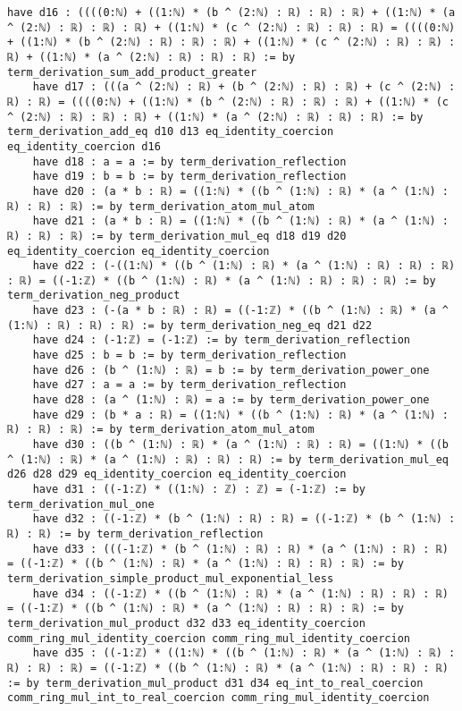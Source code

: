 \documentclass{article}
\begin{document}
\begin{tcolorbox}[colback=white!10, width=\linewidth]
\begin{lstlisting}[language=Lean4]
    have d16 : ((((0:ℕ) + ((1:ℕ) * (b ^ (2:ℕ) : ℝ) : ℝ) : ℝ) + ((1:ℕ) * (a ^ (2:ℕ) : ℝ) : ℝ) : ℝ) + ((1:ℕ) * (c ^ (2:ℕ) : ℝ) : ℝ) : ℝ) = ((((0:ℕ) + ((1:ℕ) * (b ^ (2:ℕ) : ℝ) : ℝ) : ℝ) + ((1:ℕ) * (c ^ (2:ℕ) : ℝ) : ℝ) : ℝ) + ((1:ℕ) * (a ^ (2:ℕ) : ℝ) : ℝ) : ℝ) := by term_derivation_sum_add_product_greater
    have d17 : (((a ^ (2:ℕ) : ℝ) + (b ^ (2:ℕ) : ℝ) : ℝ) + (c ^ (2:ℕ) : ℝ) : ℝ) = ((((0:ℕ) + ((1:ℕ) * (b ^ (2:ℕ) : ℝ) : ℝ) : ℝ) + ((1:ℕ) * (c ^ (2:ℕ) : ℝ) : ℝ) : ℝ) + ((1:ℕ) * (a ^ (2:ℕ) : ℝ) : ℝ) : ℝ) := by term_derivation_add_eq d10 d13 eq_identity_coercion eq_identity_coercion d16
    have d18 : a = a := by term_derivation_reflection
    have d19 : b = b := by term_derivation_reflection
    have d20 : (a * b : ℝ) = ((1:ℕ) * ((b ^ (1:ℕ) : ℝ) * (a ^ (1:ℕ) : ℝ) : ℝ) : ℝ) := by term_derivation_atom_mul_atom
    have d21 : (a * b : ℝ) = ((1:ℕ) * ((b ^ (1:ℕ) : ℝ) * (a ^ (1:ℕ) : ℝ) : ℝ) : ℝ) := by term_derivation_mul_eq d18 d19 d20 eq_identity_coercion eq_identity_coercion
    have d22 : (-((1:ℕ) * ((b ^ (1:ℕ) : ℝ) * (a ^ (1:ℕ) : ℝ) : ℝ) : ℝ) : ℝ) = ((-1:ℤ) * ((b ^ (1:ℕ) : ℝ) * (a ^ (1:ℕ) : ℝ) : ℝ) : ℝ) := by term_derivation_neg_product
    have d23 : (-(a * b : ℝ) : ℝ) = ((-1:ℤ) * ((b ^ (1:ℕ) : ℝ) * (a ^ (1:ℕ) : ℝ) : ℝ) : ℝ) := by term_derivation_neg_eq d21 d22
    have d24 : (-1:ℤ) = (-1:ℤ) := by term_derivation_reflection
    have d25 : b = b := by term_derivation_reflection
    have d26 : (b ^ (1:ℕ) : ℝ) = b := by term_derivation_power_one
    have d27 : a = a := by term_derivation_reflection
    have d28 : (a ^ (1:ℕ) : ℝ) = a := by term_derivation_power_one
    have d29 : (b * a : ℝ) = ((1:ℕ) * ((b ^ (1:ℕ) : ℝ) * (a ^ (1:ℕ) : ℝ) : ℝ) : ℝ) := by term_derivation_atom_mul_atom
    have d30 : ((b ^ (1:ℕ) : ℝ) * (a ^ (1:ℕ) : ℝ) : ℝ) = ((1:ℕ) * ((b ^ (1:ℕ) : ℝ) * (a ^ (1:ℕ) : ℝ) : ℝ) : ℝ) := by term_derivation_mul_eq d26 d28 d29 eq_identity_coercion eq_identity_coercion
    have d31 : ((-1:ℤ) * ((1:ℕ) : ℤ) : ℤ) = (-1:ℤ) := by term_derivation_mul_one
    have d32 : ((-1:ℤ) * (b ^ (1:ℕ) : ℝ) : ℝ) = ((-1:ℤ) * (b ^ (1:ℕ) : ℝ) : ℝ) := by term_derivation_reflection
    have d33 : (((-1:ℤ) * (b ^ (1:ℕ) : ℝ) : ℝ) * (a ^ (1:ℕ) : ℝ) : ℝ) = ((-1:ℤ) * ((b ^ (1:ℕ) : ℝ) * (a ^ (1:ℕ) : ℝ) : ℝ) : ℝ) := by term_derivation_simple_product_mul_exponential_less
    have d34 : ((-1:ℤ) * ((b ^ (1:ℕ) : ℝ) * (a ^ (1:ℕ) : ℝ) : ℝ) : ℝ) = ((-1:ℤ) * ((b ^ (1:ℕ) : ℝ) * (a ^ (1:ℕ) : ℝ) : ℝ) : ℝ) := by term_derivation_mul_product d32 d33 eq_identity_coercion comm_ring_mul_identity_coercion comm_ring_mul_identity_coercion
    have d35 : ((-1:ℤ) * ((1:ℕ) * ((b ^ (1:ℕ) : ℝ) * (a ^ (1:ℕ) : ℝ) : ℝ) : ℝ) : ℝ) = ((-1:ℤ) * ((b ^ (1:ℕ) : ℝ) * (a ^ (1:ℕ) : ℝ) : ℝ) : ℝ) := by term_derivation_mul_product d31 d34 eq_int_to_real_coercion comm_ring_mul_int_to_real_coercion comm_ring_mul_identity_coercion

\end{lstlisting}
\end{tcolorbox}
\end{document}
